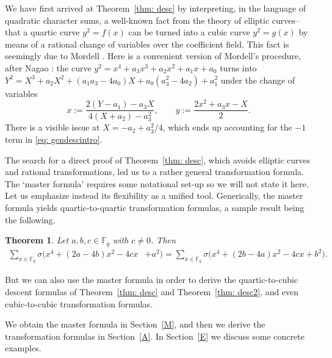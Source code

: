\documentclass[11pt]{amsart}
\newcommand{\F}{\mathbb{F}}
\newcommand{\Fq}{\F_{\!q}}
\newtheorem{thm}{Theorem}[section]
\theoremstyle{definition}
\begin{document}
We have first arrived at Theorem~\ref{thm: desc} by interpreting, in the language of quadratic character sums, a well-known fact from the theory of elliptic curves--that a quartic curve $y^2=f(x)$ can be turned into a cubic curve $y^2=g(x)$ by means of a rational change of variables over the coefficient field. This fact is seemingly due to Mordell \cite[p.77]{Mor}. Here is a convenient version of Mordell's procedure, after Nagao \cite[p.153]{Nag}: the curve $y^2=x^4+a_3x^3+a_2x^2+a_1x+a_0$ turns into $Y^2=X^3+a_2X^2+(a_1a_3-4a_0)X+ a_0(a_3^2-4a_2)+a_1^2$ under the change of variables
\[x:=\frac{2(Y-a_1)-a_3X}{4(X+a_2)-a_3^2}, \qquad y:=\frac{2x^2+a_3x-X}{2}.\]
There is a visible issue at $X=-a_2+a_3^2/4$, which ends up accounting for the $-1$ term in \eqref{eq: gendescintro}.

The search for a direct proof of Theorem~\ref{thm: desc}, which avoids elliptic curves and rational transformations, led us to a rather general transformation formula. The `master formula' requires some notational set-up so we will not state it here. Let us emphasize instead its flexibility as a unified tool. Generically, the master formula yields quartic-to-quartic transformation formulas, a sample result being the following.

\begin{thm}\label{thm: qq}
Let $a,b,c\in \Fq$ with $c\neq 0$. Then
\begin{align*}
\sum_{x\in \Fq} \sigma\big(x^4+(2a-4b)x^2-4cx&+a^2\big)=\sum_{x\in \Fq} \sigma\big(x^4+(2b-4a)x^2-4cx+b^2\big).
\end{align*}
\end{thm}
But we can also use the master formula in order to derive the quartic-to-cubic descent formulas of Theorem~\ref{thm: desc} and Theorem~\ref{thm: desc2}, and even cubic-to-cubic transformation formulas.

We obtain the master formula in Section~\ref{M}, and then we derive the transformation formulas in Section~\ref{A}. In Section~\ref{E} we discuss some concrete examples. 

\end{document}
